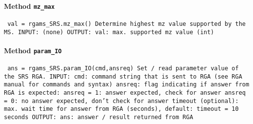 \paragraph{Method \texttt{mz_max}}
\vspace{1ex}
\texttt{\newline
val = rgams_SRS.mz_max()\newline
\newline
Determine highest mz value supported by the MS.\newline
\newline
INPUT:\newline
(none)\newline
\newline
OUTPUT:\newline
val: max. supported mz value (int)\newline
\newline
}

\paragraph{Method \texttt{param_IO}}
\vspace{1ex}
\texttt{\newline
ans = rgams_SRS.param_IO(cmd,ansreq)\newline
\newline
Set / read parameter value of the SRS RGA.\newline
\newline
INPUT:\newline
cmd: command string that is sent to RGA (see RGA manual for commands and syntax)\newline
ansreq: flag indicating if answer from RGA is expected:\newline
ansreq = 1: answer expected, check for answer\newline
ansreq = 0: no answer expected, don't check for answer\newline
timeout (optional): max. wait time for answer from RGA (seconds), default: timeout = 10 seconds\newline
\newline
OUTPUT:\newline
ans: answer / result returned from RGA\newline
\newline
}


